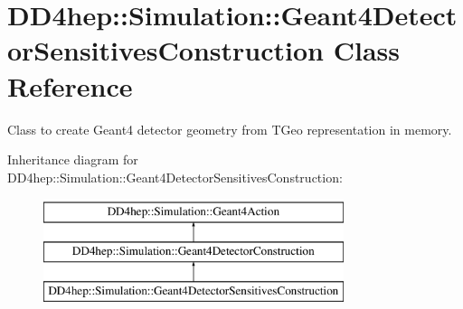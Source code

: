 \hypertarget{class_d_d4hep_1_1_simulation_1_1_geant4_detector_sensitives_construction}{}\section{D\+D4hep\+:\+:Simulation\+:\+:Geant4\+Detector\+Sensitives\+Construction Class Reference}
\label{class_d_d4hep_1_1_simulation_1_1_geant4_detector_sensitives_construction}


Class to create Geant4 detector geometry from T\+Geo representation in memory.  


Inheritance diagram for D\+D4hep\+:\+:Simulation\+:\+:Geant4\+Detector\+Sensitives\+Construction\+:\begin{figure}[H]
\begin{center}
\leavevmode
\includegraphics[height=3.000000cm]{class_d_d4hep_1_1_simulation_1_1_geant4_detector_sensitives_construction}
\end{center}
\end{figure}
